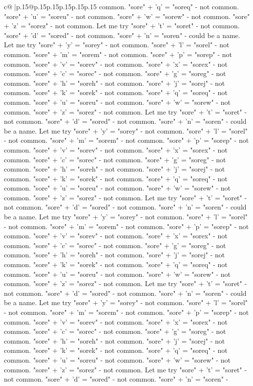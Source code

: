 \documentclass{article}
\begin{document}
{\begin{supertabular}{c@{$\;$}|p{.15\linewidth}@{}p{.15\linewidth}p{.15\linewidth}p{.15\linewidth}p{.15\linewidth}p{.15\linewidth}}
{{{common. "sore" + 'q' = "soreq" {-} not common. "sore" + 'u' = "soreu" {-} not common. "sore" + 'w' = "sorew" {-} not common. "sore" + 'z' = "sorez" {-} not common. Let me try "sore" + 't' = "soret" {-} not common. "sore" + 'd' = "sored" {-} not common. "sore" + 'n' = "soren" {-} could be a name. Let me try "sore" + 'y' = "sorey" {-} not common. "sore" + 'l' = "sorel" {-} not common. "sore" + 'm' = "sorem" {-} not common. "sore" + 'p' = "sorep" {-} not common. "sore" + 'v' = "sorev" {-} not common. "sore" + 'x' = "sorex" {-} not common. "sore" + 'c' = "sorec" {-} not common. "sore" + 'g' = "soreg" {-} not common. "sore" + 'h' = "soreh" {-} not common. "sore" + 'j' = "sorej" {-} not common. "sore" + 'k' = "sorek" {-} not common. "sore" + 'q' = "soreq" {-} not common. "sore" + 'u' = "soreu" {-} not common. "sore" + 'w' = "sorew" {-} not common. "sore" + 'z' = "sorez" {-} not common. Let me try "sore" + 't' = "soret" {-} not common. "sore" + 'd' = "sored" {-} not common. "sore" + 'n' = "soren" {-} could be a name. Let me try "sore" + 'y' = "sorey" {-} not common. "sore" + 'l' = "sorel" {-} not common. "sore" + 'm' = "sorem" {-} not common. "sore" + 'p' = "sorep" {-} not common. "sore" + 'v' = "sorev" {-} not common. "sore" + 'x' = "sorex" {-} not common. "sore" + 'c' = "sorec" {-} not common. "sore" + 'g' = "soreg" {-} not common. "sore" + 'h' = "soreh" {-} not common. "sore" + 'j' = "sorej" {-} not common. "sore" + 'k' = "sorek" {-} not common. "sore" + 'q' = "soreq" {-} not common. "sore" + 'u' = "soreu" {-} not common. "sore" + 'w' = "sorew" {-} not common. "sore" + 'z' = "sorez" {-} not common. Let me try "sore" + 't' = "soret" {-} not common. "sore" + 'd' = "sored" {-} not common. "sore" + 'n' = "soren" {-} could be a name. Let me try "sore" + 'y' = "sorey" {-} not common. "sore" + 'l' = "sorel" {-} not common. "sore" + 'm' = "sorem" {-} not common. "sore" + 'p' = "sorep" {-} not common. "sore" + 'v' = "sorev" {-} not common. "sore" + 'x' = "sorex" {-} not common. "sore" + 'c' = "sorec" {-} not common. "sore" + 'g' = "soreg" {-} not common. "sore" + 'h' = "soreh" {-} not common. "sore" + 'j' = "sorej" {-} not common. "sore" + 'k' = "sorek" {-} not common. "sore" + 'q' = "soreq" {-} not common. "sore" + 'u' = "soreu" {-} not common. "sore" + 'w' = "sorew" {-} not common. "sore" + 'z' = "sorez" {-} not common. Let me try "sore" + 't' = "soret" {-} not common. "sore" + 'd' = "sored" {-} not common. "sore" + 'n' = "soren" {-} could be a name. Let me try "sore" + 'y' = "sorey" {-} not common. "sore" + 'l' = "sorel" {-} not common. "sore" + 'm' = "sorem" {-} not common. "sore" + 'p' = "sorep" {-} not common. "sore" + 'v' = "sorev" {-} not common. "sore" + 'x' = "sorex" {-} not common. "sore" + 'c' = "sorec" {-} not common. "sore" + 'g' = "soreg" {-} not common. "sore" + 'h' = "soreh" {-} not common. "sore" + 'j' = "sorej" {-} not common. "sore" + 'k' = "sorek" {-} not common. "sore" + 'q' = "soreq" {-} not common. "sore" + 'u' = "soreu" {-} not common. "sore" + 'w' = "sorew" {-} not common. "sore" + 'z' = "sorez" {-} not common. Let me try "sore" + 't' = "soret" {-} not common. "sore" + 'd' = "sored" {-} not common. "sore" + 'n' = "soren" {-} }}}
\end{supertabular}}
\end{document}
